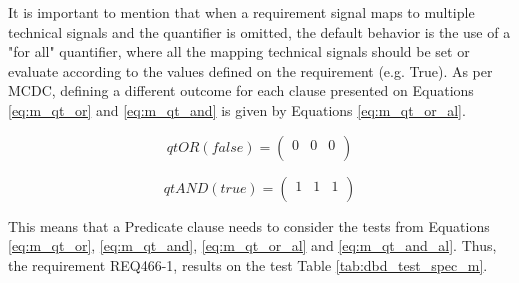 It is important to mention that when a requirement signal maps to multiple technical signals and the quantifier is omitted, the default behavior is the use of a "for all" quantifier, where all the mapping technical signals should be set or evaluate according to the values defined on the requirement (e.g. True).
As per MCDC, defining a different outcome for each clause presented on Equations \ref{eq:m_qt_or} and \ref{eq:m_qt_and} is given by Equations \ref{eq:m_qt_or_al}.

\begin{equation} \label{eq:m_qt_or_al}
qtOR (false) =
\begin{pmatrix}
0 & 0 & 0\\
\end{pmatrix}
\end{equation}

\begin{equation} \label{eq:m_qt_and_al}
qtAND (true) =
\begin{pmatrix}
1 & 1 & 1\\
\end{pmatrix}
\end{equation}

This means that a Predicate clause needs to consider the tests from Equations \ref{eq:m_qt_or}, \ref{eq:m_qt_and}, \ref{eq:m_qt_or_al} and \ref{eq:m_qt_and_al}. Thus, the requirement REQ466-1, results on the test Table \ref{tab:dbd_test_spec_m}.

